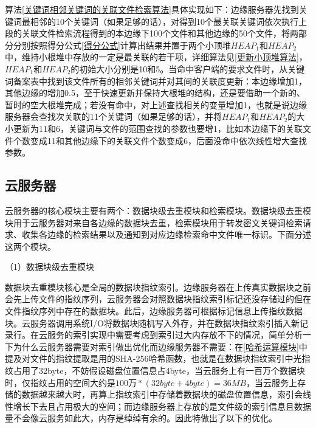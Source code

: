 \documentclass[promaster]{thesis-uestc}
\begin{document}
算法\ref{关键词相邻关键词的关联文件检索算法}具体实现如下：边缘服务器先找到关键词最相邻的10个关键词（如果足够的话），对得到10个最关联关键词依次执行上段的关联文件检索流程得到的本边缘下100个文件和其他边缘的50个文件，将两部分分别按照得分公式\ref{得分公式}计算出结果并置于两个小顶堆$HEAP_1$和$HEAP_2$中，维持小根堆中存放的一定是最关联的若干项，详细算法见\ref{更新小顶堆算法}，$HEAP_1$和$HEAP_2$的初始大小分别是10和5。当命中客户端的要求文件时，从关键词备案表中找到该文件所有的相邻关键词并对其间的关联度更新：本边缘增加1，其他边缘的增加0.5，至于快速更新并保持大根堆的结构，还是要借助一个新的、暂时的空大根堆完成；若没有命中，对上述查找相关的变量增加1，也就是说边缘服务器会查找次关联的11个关键词（如果足够的话），并将$HEAP_1$和$HEAP_2$的大小更新为11和6，关键词与文件的范围查找的参数也要增1，比如本边缘下的关联文件个数变成11和其他边缘下的关联文件个数变成6，后面没命中依次线性增大查找参数。

\subsection{云服务器}

云服务器的核心模块主要有两个：数据块级去重模块和检索模块。数据块级去重模块用于云服务器对来自各边缘的数据块去重，检索模块用于转发密文关键词检索请求、收集各边缘的检索结果以及通知到对应边缘检索命中文件唯一标识。下面分述这两个模块。

（1）数据块级去重模块

数据块去重模块核心是全局的数据块指纹索引。边缘服务器在上传真实数据块之前会先上传文件的指纹序列，云服务器会对照数据块指纹索引标记还没存储过的但在文件指纹序列中存在的数据块。此后，边缘服务器可根据标记信息上传指纹数据块。云服务器调用系统I/O将数据块随机写入外存，并在数据块指纹索引插入新记录行。在云服务的索引实现中需要考虑到索引过大内存放不下的情况，简单分析一下为什么云服务器需要对索引做出优化而边缘服务器不需要：在\ref{哈希运算模块}中提及对文件的指纹提取是用的SHA-256哈希函数，也就是在数据块指纹索引中光指纹占用了32byte，不妨假设磁盘位置信息占4byte，当云服务上有一百万个数据块时，仅指纹占用的空间大约是$100万 * (32byte + 4byte) = 36MB$，当云服务上存储的数据越来越大时，再算上指纹索引中存储着数据块的磁盘位置信息，索引会线性增长下去且占用极大的空间；而边缘服务器上存放的是文件级的索引信息且数据量不会像云服务如此大，内存是绰绰有余的。因此特做出了以下的优化。
\end{document}
